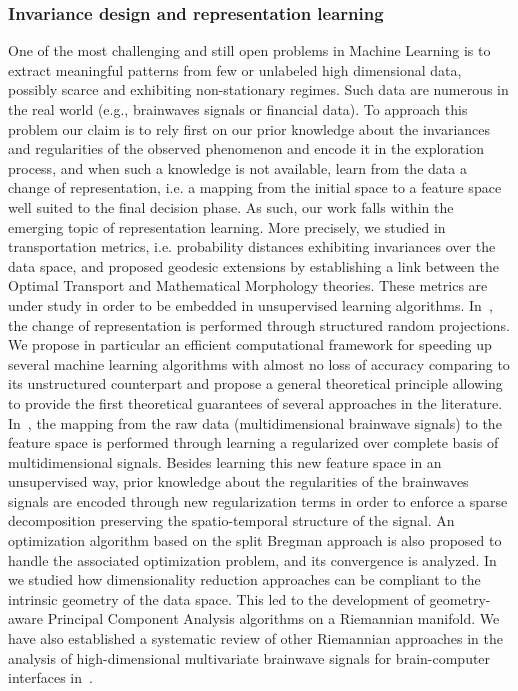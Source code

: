 \subsubsection{Invariance design and representation learning}
One of the most challenging and still open problems in Machine Learning is to extract meaningful patterns from few or unlabeled high dimensional data, possibly scarce and exhibiting non-stationary regimes. Such data are numerous in the real world (e.g., brainwaves signals or financial data). To approach this problem our claim is to rely first on our prior knowledge about the invariances and regularities of the observed phenomenon and encode it in the exploration process, and when such a knowledge is not available, learn from the data a change of representation, i.e. a mapping from the initial space to a feature space well suited to the final decision phase. As such, our work falls within the emerging topic of representation learning. More precisely, we studied in~\cite{Bloch2016Defining-1222794} transportation metrics, i.e. probability distances exhibiting invariances over the data space, and proposed geodesic extensions  by establishing a link between the Optimal Transport and Mathematical Morphology theories. These metrics are under study in order to be embedded in unsupervised learning algorithms.   In~\cite{Bojarski2017Structured-1259771}, the change of representation is performed through structured random projections. We propose in particular  an efficient computational framework for speeding up several machine learning algorithms with almost no loss of accuracy
comparing to its unstructured counterpart and propose a general theoretical
principle allowing to provide the first theoretical guarantees of several approaches in the literature. In~\cite{Isaac2017Multi-dimensional-1222778}, the mapping from the raw data (multidimensional brainwave signals) to the feature space is performed through learning a regularized over complete basis of multidimensional signals. Besides learning this new feature space in an unsupervised way, prior knowledge about the regularities of the brainwaves signals are encoded through new regularization terms in order to enforce a sparse decomposition preserving the spatio-temporal structure of the signal.  An optimization algorithm based on the split
Bregman approach is also proposed to handle the associated optimization problem,
and  its  convergence  is  analyzed. In~\cite{Horev2016Geometry-aware-1241260,Yamane2016Multitask-1241267} we studied how dimensionality reduction approaches can be compliant to the intrinsic geometry of the data space. This led to the development of geometry-aware Principal Component Analysis algorithms on a Riemannian manifold. We have also established a systematic review of other Riemannian approaches in the analysis of high-dimensional multivariate brainwave signals for brain-computer interfaces in~\cite{Yger2017Riemannian-1241283}.


